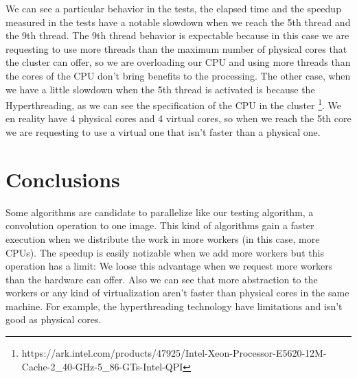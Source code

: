 \documentclass{article}
\begin{document}
	We can see a particular behavior in the tests, the elapsed time and the speedup measured in the tests have a notable slowdown when we reach the 5th thread and the 9th thread. The 9th thread behavior is expectable because in this case we are requesting to use more threads than the maximum number of physical cores that the cluster can offer, so we are overloading our CPU and using more threads than the cores of the CPU don't bring benefits to the processing. The other case, when we have a little slowdown when the 5th thread is activated is because the Hyperthreading, as we can see the specification of the CPU in the cluster \footnote{https://ark.intel.com/products/47925/Intel-Xeon-Processor-E5620-12M-Cache-2\_40-GHz-5\_86-GTs-Intel-QPI}. We en reality have 4 physical cores and 4 virtual cores, so when we reach the 5th core we are requesting to use a virtual one that isn't faster than a physical one.

	\section{Conclusions}
	Some algorithms are candidate to parallelize like our testing algorithm, a convolution operation to one image. This kind of algorithms gain a faster execution when we distribute the work in more workers (in this case, more CPUs). The speedup is easily notizable when we add more workers but this operation has a limit: We loose this advantage when we request more workers than the hardware can offer. Also we can see that more abstraction to the workers or any kind of virtualization aren't faster than physical cores in the same machine. For example, the hyperthreading technology have limitations and isn't good as physical cores. 
\end{document}

